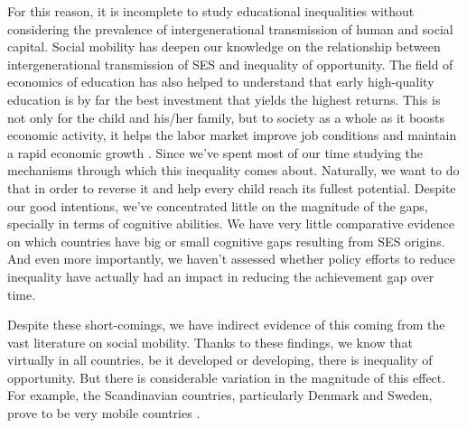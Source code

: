 \documentclass[11pt, a4paper]{article}\usepackage[]{graphicx}\usepackage[]{color}
\begin{document}
For this reason, it is incomplete to study educational inequalities without considering the prevalence of intergenerational transmission of human and social capital. Social mobility has deepen our knowledge on the relationship between intergenerational transmission of SES and inequality of opportunity. The field of economics of education has also helped to understand that early high-quality education is by far the best investment that yields the highest returns. This is not only for the child and his/her family, but to society as a whole as it boosts economic activity, it helps the labor market improve job conditions and maintain a rapid economic growth \citep{hanushek2007}. Since \citet{coleman1966} we've spent most of our time studying the mechanisms through which this inequality comes about. Naturally, we want to do that in order to reverse it and help every child reach its fullest potential. Despite our good intentions, we've concentrated little on the magnitude of the gaps, specially in terms of cognitive abilities. We have very little comparative evidence on which countries have big or small cognitive gaps resulting from SES origins. And even more importantly, we haven't assessed whether policy efforts to reduce inequality have actually had an impact in reducing the achievement gap over time.

Despite these short-comings, we have indirect evidence of this coming from the vast literature on social mobility. Thanks to these findings, we know that virtually in all countries, be it developed or developing, there is inequality of opportunity. But there is considerable variation in the magnitude of this effect. For example, the Scandinavian countries, particularly Denmark and Sweden, prove to be very mobile countries \citep{esping2012, breen2007, shavit1993}.
\end{document}
